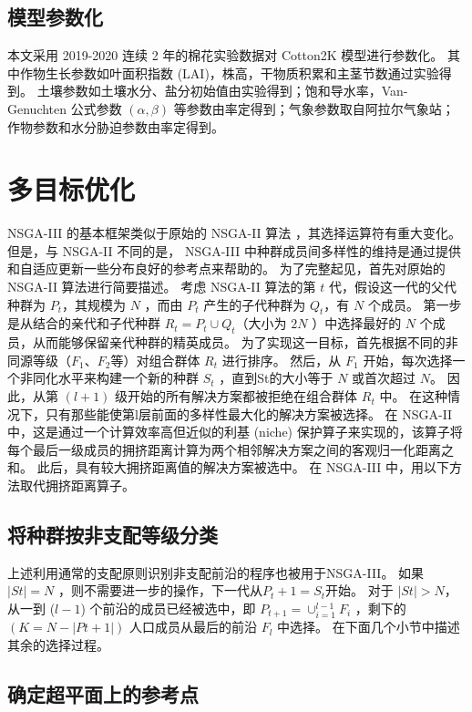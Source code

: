 \subsection{模型参数化}
本文采用 2019-2020 连续 2 年的棉花实验数据对 Cotton2K 模型进行参数化。
其中作物生长参数如叶面积指数 (LAI)，株高，干物质积累和主茎节数通过实验得到。
土壤参数如土壤水分、盐分初始值由实验得到；饱和导水率，Van-Genuchten
公式参数 $(\alpha, \beta)$ 等参数由率定得到；气象参数取自阿拉尔气象站；
作物参数和水分胁迫参数由率定得到。

\section{多目标优化}
NSGA-III 的基本框架类似于原始的 NSGA-II 算法 \cite{NSGA2}，其选择运算符有重大变化。
但是，与 NSGA-II 不同的是， NSGA-III 中种群成员间多样性的维持是通过提供和自适应更新一些分布良好的参考点来帮助的。
为了完整起见，首先对原始的 NSGA-II 算法进行简要描述。
考虑 NSGA-II 算法的第 $t$ 代，假设这一代的父代种群为 $P_t$，其规模为 $N$ ，而由 $P_t$ 产生的子代种群为 $Q_t$，有 $N$ 个成员。
第一步是从结合的亲代和子代种群 $R_t = P_t \cup Q_t$（大小为 $2N$ ）中选择最好的 $N$ 个成员，从而能够保留亲代种群的精英成员。
为了实现这一目标，首先根据不同的非同源等级（$F_1$、$F_2$等）对组合群体 $R_t$ 进行排序。
然后，从 $F_1$ 开始，每次选择一个非同化水平来构建一个新的种群 $S_t$ ，直到St的大小等于 $N$ 或首次超过 $N$。
因此，从第 $(l+1)$ 级开始的所有解决方案都被拒绝在组合群体 $R_t$ 中。
在这种情况下，只有那些能使第l层前面的多样性最大化的解决方案被选择。
在 NSGA-II 中，这是通过一个计算效率高但近似的利基 (niche) 保护算子来实现的，该算子将每个最后一级成员的拥挤距离计算为两个相邻解决方案之间的客观归一化距离之和。
此后，具有较大拥挤距离值的解决方案被选中。
在 NSGA-III 中，用以下方法取代拥挤距离算子。

\subsection{将种群按非支配等级分类}

上述利用通常的支配原则\cite{chankong1983}识别非支配前沿的程序也被用于NSGA-III。
如果 $|St|=N$ ，则不需要进一步的操作，下一代从$P_t+1=S_t$开始。
对于 $|St|>N$，从一到 ($l-1$) 个前沿的成员已经被选中，即 $P_{t+1}= \cup_{i=1}^{l-1} F_i$ ，剩下的 $(K=N-|Pt+1|)$ 人口成员从最后的前沿 $F_l$ 中选择。
在下面几个小节中描述其余的选择过程。

\subsection{确定超平面上的参考点}

